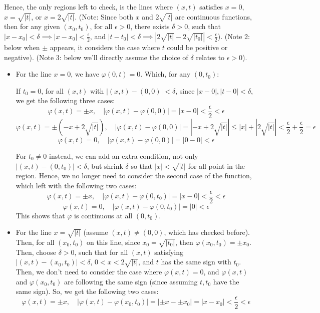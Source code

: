 \documentclass{article}
\begin{document}
Hence, the only regions left to check, is the lines where $(x,t)$ satisfies $x=0$, $x=\sqrt{|t|}$, or $x=2\sqrt{|t|}$. (Note: Since both $x$ and $2\sqrt{|t|}$ are continuous functions, then for any given $(x_0,t_0)$, for all $\epsilon>0$, there exists $\delta>0$, such that $|x-x_0|<\delta \implies |x-x_0|<\frac{\epsilon}{2}$, and $|t-t_0|<\delta\implies |2\sqrt{|t|}-2\sqrt{|t_0|}|<\frac{\epsilon}{2}$). (Note 2: below when $\pm$ appears, it considers the case where $t$ could be positive or negative). (Note 3: below we'll directly assume the choice of $\delta$ relates to $\epsilon>0$).
\begin{itemize}
    \item For the line $x=0$, we have $\varphi(0,t)=0$. Which, for any $(0,t_0)$:
    
    If $t_0=0$, for all $(x,t)$ with $|(x,t)-(0,0)|<\delta$, since $|x-0|,|t-0|<\delta$, we get the following three cases:
    $$\varphi(x,t)=\pm x,\quad |\varphi(x,t)-\varphi(0,0)| = |x-0| < \frac{\epsilon}{2}<\epsilon$$
    $$\varphi(x,t)=\pm(-x+2\sqrt{|t|}),\quad |\varphi(x,t)-\varphi(0,0)| = |-x+2\sqrt{|t|}| \leq |x| + |2\sqrt{|t|}| < \frac{\epsilon}{2}+\frac{\epsilon}{2}=\epsilon$$
    $$\varphi(x,t)=0,\quad |\varphi(x,t)-\varphi(0,0)| = |0-0| < \epsilon$$

    For $t_0\neq 0$ instead, we can add an extra condition, not only $|(x,t)-(0,t_0)|<\delta$, but shrink $\delta$ so that $|x|<\sqrt{|t|}$ for all point in the region. Hence, we no longer need to consider the second case of the function, which left with the following two cases:
    $$\varphi(x,t)=\pm x,\quad |\varphi(x,t)-\varphi(0,t_0)| = |x-0| < \frac{\epsilon}{2}<\epsilon$$
    $$\varphi(x,t)=0,\quad |\varphi(x,t)-\varphi(0,t_0)|=|0|<\epsilon$$
    This shows that $\varphi$ is continuous at all $(0,t_0)$.

    \item For the line $x=\sqrt{|t|}$ (assume $(x,t)\neq (0,0)$, which has checked before). Then, for all $(x_0,t_0)$ on this line, since $x_0=\sqrt{|t_0|}$, then $\varphi(x_0,t_0)=\pm x_0$. Then, choose $\delta>0$, such that for all $(x,t)$ satisfying $|(x,t)-(x_0,t_0)| <\delta$, $0<x<2\sqrt{|t|}$, and $t$ has the same sign with $t_0$. Then, we don't need to consider the case where $\varphi(x,t)=0$, and $\varphi(x,t)$ and $\varphi(x_0,t_0)$ are following the same sign (since assuming $t,t_0$ have the same sign). So, we get the following two cases:
    $$\varphi(x,t)=\pm x,\quad |\varphi(x,t)-\varphi(x_0,t_0)| = |\pm x - \pm x_0| = |x-x_0| < \frac{\epsilon}{2}<\epsilon$$


\end{itemize}
\end{document}
